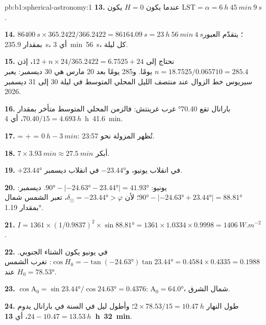 \begin{solution}{pb:b1:spherical-astronomy:1}
\textbf{13.} عندما يكون $H = 0$ يكون $\mathrm{LST} = \alpha = \qty{6}{h}~\qty{45}{min}~\qty{9}{s}$.

\textbf{14.} $\qty{86400}{s}\times365.2422/366.2422 = \qty{86164.09}{s} =
\qty{23}{h}~\qty{56}{min}~\qty{4}{s}$؛ يتقدّم العبور بمقدار
\qty{235.9}{s}، أي \qty{3}{min}~\qty{56}{s}، كل ليلة.

\textbf{15.} نحتاج إلى $12 + n\times24/365.2422 = 6.7525 + 24$، إذن
$n = 18.7525/0.065710 = 285.4$ يومًا. و285 يومًا بعد 20 مارس هي 30 ديسمبر: يعبر سيريوس خط الزوال عند منتصف الليل المحلي المتوسط في ليلة 30 إلى 31 ديسمبر 2026.

\textbf{16.} بارانال تقع \ang{70.40} غرب غرينتش: فالزمن المحلي المتوسط متأخر بمقدار $70.40/15 = \qty{4.693}{h}$، أي \qty{4}{h}~\qty{41.6}{min}.

\textbf{17.}  =  +  =
$\qty{0}{h} - \qty{3}{min}$: تُظهر المزولة نحو 23:57.

\textbf{18.} $7\times\qty{3.93}{min} \approx \qty{27.5}{min}$ أبكر.

\textbf{19.} $+\ang{23.44}$ في انقلاب يونيو، و$-\ang{23.44}$ في انقلاب ديسمبر.

\textbf{20.} يونيو: $\ang{90} - |\ang{-24.63} - \ang{23.44}| = \ang{41.93}$.
ديسمبر: $\ang{90} - |\ang{-24.63} + \ang{23.44}| = \ang{88.81}$؛ لأن
$\delta_\odot = \ang{-23.44} > \varphi$، تعبر الشمس شمال  بمقدار \ang{1.19}.

\textbf{21.} $I = 1361\times(1/0.9837)^2\times\sin\ang{88.81} = 1361\times
1.0334\times0.9998 = \qty{1406}{W.m^{-2}}$.

\textbf{22.} في يونيو يكون الشتاء الجنوبي. $\cos H_0 = -\tan(\ang{-24.63})
\tan\ang{23.44} = 0.4584\times0.4335 = 0.1988$: تغرب الشمس عند 
$H_0 = \ang{78.53}$.

\textbf{23.} $\cos\mathrm{A}_0 = \sin\ang{23.44}/\cos\ang{24.63} = 0.4376$:
$\mathrm{A}_0 = \ang{64.0}$، شمال الشرق.

\textbf{24.} طول النهار $2\times78.53/15 = \qty{10.47}{h}$؛ وأطول ليل في السنة في بارانال يدوم $24 - 10.47 = \qty{13.53}{h}$، أي
\textbf{\qty[text-series-to-math=true]{13}{h}~\qty[text-series-to-math=true]{32}{min}}.
\end{solution}
